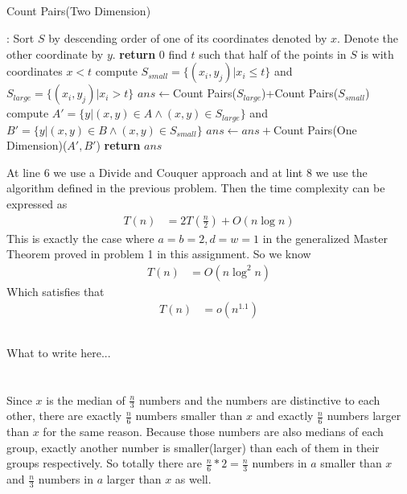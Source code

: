 \documentclass[12pt,letterpaper]{article}
\begin{document}
\subsection{}
\begin{algorithm}
    \caption{Count Pairs(Two Dimension)}\label{alg:count2d}
    \begin{algorithmic}[1]
    :
    \State Sort $S$ by descending order of one of its coordinates denoted by $x$. Denote the other coordinate by $y$.
     \textbf{return} 0
    \EndIf
    \State find $t$ such that half of the points in $S$ is with coordinates $x<t$ 
    \State compute $S_{small}=\{(x_i,y_j)|x_i\leq t\}$ and $S_{large}=\{(x_i,y_j)|x_i> t\}$  
    \State $ans\gets $Count Pairs($S_{large}$)+Count Pairs($S_{small}$)
    \State compute $A'=\{y|(x,y)\in A\wedge (x,y)\in S_{large}\}$ and $B'=\{y|(x,y)\in B\wedge (x,y)\in S_{small}\}$ 
    \State $ans\gets ans+$Count Pairs(One Dimension)($A',B'$)
    \State \textbf{return} $ans$
    \EndProcedure
    \end{algorithmic}
\end{algorithm}
At line 6 we use a Divide and Couquer approach and at lint 8 we use the algorithm defined in the previous problem. Then the time complexity can be expressed as 
\begin{align}
    T(n)&=2T(\frac{n}{2})+O(n\log n)
\end{align}
This is exactly the case where $a=b=2,d=w=1$ in the generalized Master Theorem proved in problem 1 in this assignment. So we know 
\begin{align}
    T(n)&=O(n\log^2n)
\end{align}
Which satisfies that 
\begin{align}
    T(n)&=o(n^{1.1})
\end{align}
\subsection{}
What to write here...
\section{}
\subsection{}
Since $x$ is the median of $\frac{n}{3}$ numbers and the numbers are distinctive to each other, there are exactly $\frac{n}{6}$ numbers smaller than $x$ and exactly $\frac{n}{6}$ numbers larger than $x$ for the same reason. Because those numbers are also medians of each group, exactly another number is smaller(larger) than each of them in their groups respectively. So totally there are $\frac{n}{6}*2=\frac{n}{3}$ numbers in $a$ smaller than $x$ and $\frac{n}{3}$ numbers in $a$ larger than $x$ as well. 
\end{document}
